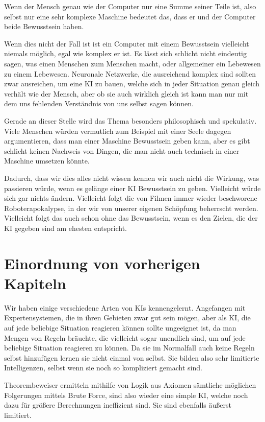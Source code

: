 Wenn der Mensch genau wie der Computer nur eine Summe seiner Teile ist, also selbst nur eine sehr komplexe Maschine bedeutet das, dass er und der Computer beide Bewusstsein haben.

Wenn dies nicht der Fall ist ist ein Computer mit einem Bewusstsein vielleicht niemals möglich, egal wie komplex er ist.
Es lässt sich schlicht nicht eindeutig sagen, was einen Menschen zum Menschen macht, oder allgemeiner ein Lebewesen zu einem Lebewesen.
Neuronale Netzwerke, die ausreichend komplex sind sollten zwar ausreichen, um eine KI zu bauen, welche sich in jeder Situation genau gleich verhält wie der Mensch, aber ob sie auch wirklich gleich ist kann man nur mit dem uns fehlenden Verständnis von uns selbst sagen können.

Gerade an dieser Stelle wird das Thema besonders philosophisch und spekulativ.
Viele Menschen würden vermutlich zum Beispiel mit einer Seele dagegen argumentieren, dass man einer Maschine Bewusstsein geben kann, aber es gibt schlicht keinen Nachweis von Dingen, die man nicht auch technisch in einer Maschine umsetzen könnte.

Dadurch, dass wir dies alles nicht wissen kennen wir auch nicht die Wirkung, was passieren würde, wenn es gelänge einer KI Bewusstsein zu geben.
Vielleicht würde sich gar nichts ändern.
Vielleicht folgt die von Filmen immer wieder beschworene Roboterapokalypse, in der wir von unserer eigenen Schöpfung beherrscht werden.
Vielleicht folgt das auch schon ohne das Bewusstsein, wenn es den Zielen, die der KI gegeben sind am ehesten entspricht.

\section{Einordnung von vorherigen Kapiteln}
Wir haben einige verschiedene Arten von KIs kennengelernt.
Angefangen mit Expertensystemen, die in ihren Gebieten zwar gut sein mögen, aber als KI, die auf jede beliebige Situation reagieren können sollte ungeeignet ist, da man Mengen von  Regeln bräuchte, die vielleicht sogar unendlich sind, um auf jede beliebige Situation reagieren zu können.
Da sie im Normalfall auch keine Regeln selbst hinzufügen lernen sie nicht einmal von selbst.
Sie bilden also sehr limitierte Intelligenzen, selbst wenn sie noch so kompliziert gemacht sind.

Theorembeweiser ermitteln mithilfe von Logik aus Axiomen sämtliche möglichen Folgerungen mittels Brute Force, sind also wieder eine simple KI, welche noch dazu für größere Berechnungen ineffizient sind.
Sie sind ebenfalls äußerst limitiert.

